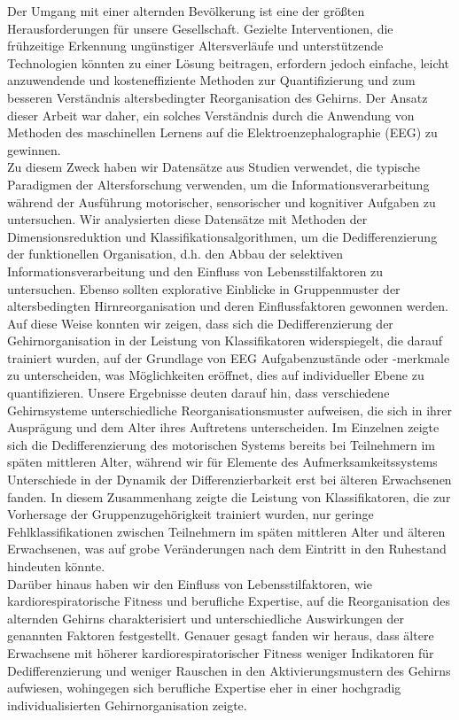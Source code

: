 Der Umgang mit einer alternden Bevölkerung ist eine der größten Herausforderungen für unsere Gesellschaft. Gezielte Interventionen, die frühzeitige Erkennung ungünstiger Altersverläufe und unterstützende Technologien könnten zu einer Lösung beitragen, erfordern jedoch einfache, leicht anzuwendende und kosteneffiziente Methoden zur Quantifizierung und zum besseren Verständnis altersbedingter Reorganisation des Gehirns. Der Ansatz dieser Arbeit war daher, ein solches Verständnis durch die Anwendung von Methoden des maschinellen Lernens auf die Elektroenzephalographie (EEG) zu gewinnen.\\
Zu diesem Zweck haben wir Datensätze aus Studien verwendet, die typische Paradigmen der Altersforschung verwenden, um die Informationsverarbeitung während der Ausführung motorischer, sensorischer und kognitiver Aufgaben zu untersuchen. Wir analysierten diese Datensätze mit Methoden der Dimensionsreduktion und Klassifikationsalgorithmen, um die Dedifferenzierung der funktionellen Organisation, d.h. den Abbau der selektiven Informationsverarbeitung und den Einfluss von Lebensstilfaktoren zu untersuchen. Ebenso sollten explorative Einblicke in Gruppenmuster der altersbedingten Hirnreorganisation und deren Einflussfaktoren gewonnen werden.\\
Auf diese Weise konnten wir zeigen, dass sich die Dedifferenzierung der Gehirnorganisation in der Leistung von Klassifikatoren widerspiegelt, die darauf trainiert wurden, auf der Grundlage von EEG Aufgabenzustände oder -merkmale zu unterscheiden, was Möglichkeiten eröffnet, dies auf individueller Ebene zu quantifizieren. Unsere Ergebnisse deuten darauf hin, dass verschiedene Gehirnsysteme unterschiedliche Reorganisationsmuster aufweisen, die sich in ihrer Ausprägung und dem Alter ihres Auftretens unterscheiden. Im Einzelnen zeigte sich die Dedifferenzierung des motorischen Systems bereits bei Teilnehmern im späten mittleren Alter, während wir für Elemente des Aufmerksamkeitssystems Unterschiede in der Dynamik der Differenzierbarkeit erst bei älteren Erwachsenen fanden. In diesem Zusammenhang zeigte die Leistung von Klassifikatoren, die zur Vorhersage der Gruppenzugehörigkeit trainiert wurden, nur geringe Fehlklassifikationen zwischen Teilnehmern im späten mittleren Alter und älteren Erwachsenen, was auf grobe Veränderungen nach dem Eintritt in den Ruhestand hindeuten könnte.\\
Darüber hinaus haben wir den Einfluss von Lebensstilfaktoren, wie kardiorespiratorische Fitness und berufliche Expertise, auf die Reorganisation des alternden Gehirns charakterisiert und unterschiedliche Auswirkungen der genannten Faktoren festgestellt. Genauer gesagt fanden wir heraus, dass ältere Erwachsene mit höherer kardiorespiratorischer Fitness weniger Indikatoren für Dedifferenzierung und weniger Rauschen in den Aktivierungsmustern des Gehirns aufwiesen, wohingegen sich berufliche Expertise eher in einer hochgradig individualisierten Gehirnorganisation zeigte.\\

